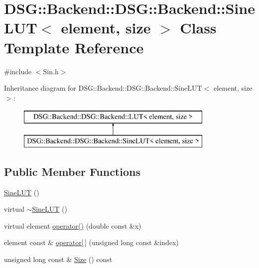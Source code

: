 \hypertarget{classDSG_1_1Backend_1_1DSG_1_1Backend_1_1SineLUT}{\section{D\+S\+G\+:\+:Backend\+:\+:D\+S\+G\+:\+:Backend\+:\+:Sine\+L\+U\+T$<$ element, size $>$ Class Template Reference}
\label{classDSG_1_1Backend_1_1DSG_1_1Backend_1_1SineLUT}
}


{\ttfamily \#include $<$Sin.\+h$>$}

Inheritance diagram for D\+S\+G\+:\+:Backend\+:\+:D\+S\+G\+:\+:Backend\+:\+:Sine\+L\+U\+T$<$ element, size $>$\+:\begin{figure}[H]
\begin{center}
\leavevmode
\includegraphics[height=2.000000cm]{classDSG_1_1Backend_1_1DSG_1_1Backend_1_1SineLUT}
\end{center}
\end{figure}
\subsection*{Public Member Functions}
\begin{DoxyCompactItemize}
\item 
\hyperlink{classDSG_1_1Backend_1_1DSG_1_1Backend_1_1SineLUT_a8efd77efae17db98591b2fa01962e234}{Sine\+L\+U\+T} ()
\item 
virtual \hyperlink{classDSG_1_1Backend_1_1DSG_1_1Backend_1_1SineLUT_af732d15e88429aeced938fe925624b3e}{$\sim$\+Sine\+L\+U\+T} ()
\item 
virtual element \hyperlink{classDSG_1_1Backend_1_1DSG_1_1Backend_1_1SineLUT_aaa841c0b14ec2a470d18932b816f78e6}{operator()} (double const \&x)
\item 
element const \& \hyperlink{classDSG_1_1Backend_1_1DSG_1_1Backend_1_1LUT_acd6db2fa4eba392de1cbb4795f351f8a}{operator\mbox{[}$\,$\mbox{]}} (unsigned long const \&index)
\item 
unsigned long const \& \hyperlink{classDSG_1_1Backend_1_1DSG_1_1Backend_1_1LUT_a65daa6f46f978a64da1c86089847602d}{Size} () const 
\end{DoxyCompactItemize}
